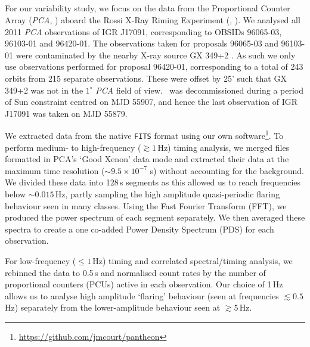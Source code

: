 \begin{figure}
   \label{fig:allmissions}
\end{figure}

\subsection{\rxte}

\label{sec:XTEDA}

\par For our variability study, we focus on the data from the Proportional Counter Array (\textit{PCA}, \citealp{Jahoda_PCA}) aboard the Rossi X-Ray Riming Experiment (\rxte , \citealp{Bradt_RXTE}).  We analysed all 2011 \textit{PCA} observations of IGR J17091, corresponding to OBSIDs 96065-03, 96103-01 and 96420-01.  The observations taken for proposals 96065-03 and 96103-01 were contaminated by the nearby X-ray source GX 349+2 \citep{Altamirano_IGR_FH,Rodriguez_Contamination}.  As such we only use observations performed for proposal 96420-01, corresponding to a total of 243 orbits from 215 separate observations.  These were offset by 25' such that GX 349+2 was not in the $1^\circ$ \textit{PCA} field of view.  \rxte\ was decommissioned during a period of Sun constraint centred on MJD 55907,  and hence the last observation of IGR J17091 was taken on MJD 55879.
\par We extracted data from the native \texttt{FITS} format using our own software\footnote{\url{https://github.com/jmcourt/pantheon}}.  To perform medium- to high-frequency ($\gtrsim1$\,Hz) timing analysis, we merged files formatted in PCA's `Good Xenon' data mode and extracted their data at the maximum time resolution ($\sim9.5\times10^{-7}$ s) without accounting for the background.  We divided these data into 128\,s segments as this allowed us to reach frequencies below $\sim0.015$\,Hz, partly sampling the high amplitude quasi-periodic flaring behaviour seen in many classes.  Using the Fast Fourier Transform (FFT), we produced the power spectrum of each segment separately.  We then averaged these spectra to create a one co-added Power Density Spectrum (PDS) for each observation.
\par For low-frequency ($\leq1$\,Hz) timing and correlated spectral/timing analysis, we rebinned the data to 0.5\,s and normalised count rates by the number of proportional counters (PCUs) active in each observation.  Our choice of 1\,Hz allows us to analyse high amplitude `flaring' behaviour (seen at frequencies $\lesssim0.5$\,Hz) separately from the lower-amplitude behaviour seen at $\gtrsim5$\,Hz.
